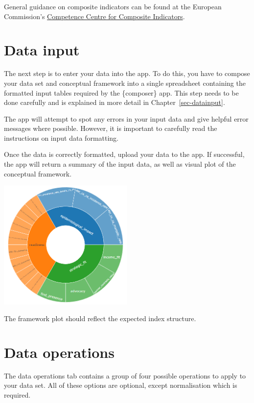\documentclass[
  letterpaper,
  DIV=11,
  numbers=noendperiod]{scrreprt}
\begin{document}
General guidance on composite indicators can be found at the European
Commission's
\href{https://knowledge4policy.ec.europa.eu/composite-indicators_en}{Competence
Centre for Composite Indicators}.

\hypertarget{data-input}{%
\section{Data input}\label{data-input}}

The next step is to enter your data into the app. To do this, you have
to compose your data set and conceptual framework into a single
spreadsheet containing the formatted input tables required by the
\{composer\} app. This step needs to be done carefully and is explained
in more detail in Chapter~\ref{sec-datainput}.

The app will attempt to spot any errors in your input data and give
helpful error messages where possible. However, it is important to
carefully read the instructions on input data formatting.

Once the data is correctly formatted, upload your data to the app. If
successful, the app will return a summary of the input data, as well as
visual plot of the conceptual framework.

\includegraphics[width=0.5\textwidth,height=\textheight]{figs/framework.png}

The framework plot should reflect the expected index structure.

\hypertarget{data-operations}{%
\section{Data operations}\label{data-operations}}

The data operations tab contains a group of four possible operations to
apply to your data set. All of these options are optional, except
normalisation which is required.
\end{document}
